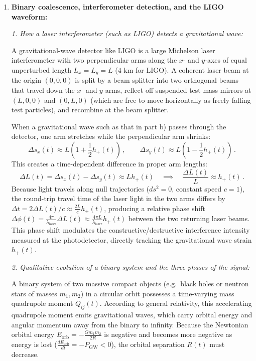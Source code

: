 \documentclass[12pt]{article}
\newcommand{\be}{\begin{equation}}
\newcommand{\ee}{\end{equation}}
\begin{document}
\begin{enumerate}[label=\alph*)]
\item \textbf{Binary coalescence, interferometer detection, and the LIGO waveform:}

\emph{1. How a laser interferometer (such as LIGO) detects a gravitational wave:}

A gravitational-wave detector like LIGO is a large Michelson laser interferometer with two perpendicular arms along the $x$- and $y$-axes of equal unperturbed length $L_x = L_y = L$ ($4\text{ km}$ for LIGO). A coherent laser beam at the origin $(0,0,0)$ is split by a beam splitter into two orthogonal beams that travel down the $x$- and $y$-arms, reflect off suspended test-mass mirrors at $(L,0,0)$ and $(0,L,0)$ (which are free to move horizontally as freely falling test particles), and recombine at the beam splitter.

When a gravitational wave such as that in part b) passes through the detector, one arm stretches while the perpendicular arm shrinks:
\be
\Delta s_x(t) \approx L \left( 1 + \frac{1}{2} h_{+}(t) \right) \,, \qquad \Delta s_y(t) \approx L \left( 1 - \frac{1}{2} h_{+}(t) \right) \,.
\ee
This creates a time-dependent difference in proper arm lengths:
\be
\Delta L(t) = \Delta s_x(t) - \Delta s_y(t) \approx L h_{+}(t) \quad \implies \quad \frac{\Delta L(t)}{L} \approx h_{+}(t) \,.
\ee
Because light travels along null trajectories ($ds^2 = 0$, constant speed $c=1$), the round-trip travel time of the laser light in the two arms differs by $\Delta t = 2\Delta L(t)/c \approx \frac{2L}{c} h_{+}(t)$, producing a relative phase shift $\Delta\phi(t) = \frac{4\pi}{\lambda_{\text{laser}}} \Delta L(t) \approx \frac{4\pi L}{\lambda_{\text{laser}}} h_{+}(t)$ between the two returning laser beams. This phase shift modulates the constructive/destructive interference intensity measured at the photodetector, directly tracking the gravitational wave strain $h_{+}(t)$.

\medskip
\emph{2. Qualitative evolution of a binary system and the three phases of the signal:}

A binary system of two massive compact objects (e.g.\ black holes or neutron stars of masses $m_1, m_2$) in a circular orbit possesses a time-varying mass quadrupole moment $Q_{ij}(t)$. According to general relativity, this accelerating quadrupole moment emits gravitational waves, which carry orbital energy and angular momentum away from the binary to infinity. Because the Newtonian orbital energy $E_{\text{orb}} = -\frac{G m_1 m_2}{2 R}$ is negative and becomes more negative as energy is lost ($\frac{dE_{\text{orb}}}{dt} = -P_{\text{GW}} < 0$), the orbital separation $R(t)$ must decrease.


\end{enumerate}
\end{document}
